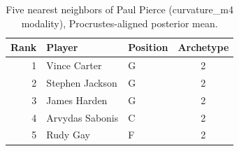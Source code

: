 \begin{table}[htbp]
  \centering\small
  \begin{tabular}{rllc}
    \toprule
    Rank & Player & Position & Archetype \\
    \midrule
    1 & Vince Carter & G & 2 \\
    2 & Stephen Jackson & G & 2 \\
    3 & James Harden & G & 2 \\
    4 & Arvydas Sabonis & C & 2 \\
    5 & Rudy Gay & F & 2 \\
    \bottomrule
  \end{tabular}
  \caption{Five nearest neighbors of Paul Pierce (curvature_m4 modality), Procrustes-aligned posterior mean.}
  \label{tab:Paul_Pierce_neighbors_curvature_m4}
\end{table}

